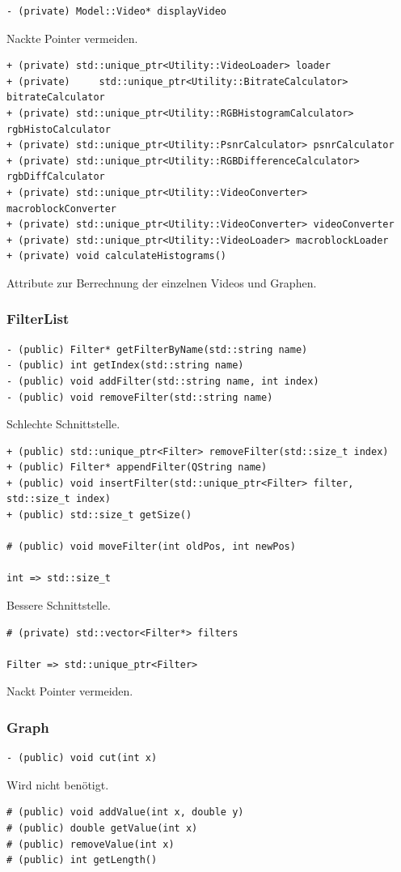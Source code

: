 \documentclass{scrartcl}
\begin{document}
{\begin{verbatim}
- (private) Model::Video* displayVideo
\end{verbatim}
Nackte Pointer vermeiden.
\bigskip
\begin{verbatim}
+ (private) std::unique_ptr<Utility::VideoLoader> loader
+ (private) 	std::unique_ptr<Utility::BitrateCalculator> bitrateCalculator
+ (private) std::unique_ptr<Utility::RGBHistogramCalculator> rgbHistoCalculator
+ (private) std::unique_ptr<Utility::PsnrCalculator> psnrCalculator
+ (private) std::unique_ptr<Utility::RGBDifferenceCalculator> rgbDiffCalculator
+ (private) std::unique_ptr<Utility::VideoConverter> macroblockConverter
+ (private) std::unique_ptr<Utility::VideoConverter> videoConverter
+ (private) std::unique_ptr<Utility::VideoLoader> macroblockLoader
+ (private) void calculateHistograms()
\end{verbatim}
Attribute zur Berrechnung der einzelnen Videos und Graphen.
\newpage
\subsubsection{FilterList}
\bigskip
\begin{verbatim}
- (public) Filter* getFilterByName(std::string name)
- (public) int getIndex(std::string name)
- (public) void addFilter(std::string name, int index)
- (public) void removeFilter(std::string name)
\end{verbatim}
Schlechte Schnittstelle.
\bigskip
\begin{verbatim}
+ (public) std::unique_ptr<Filter> removeFilter(std::size_t index)
+ (public) Filter* appendFilter(QString name)
+ (public) void insertFilter(std::unique_ptr<Filter> filter, std::size_t index)
+ (public) std::size_t getSize()

# (public) void moveFilter(int oldPos, int newPos)

int => std::size_t
\end{verbatim}
Bessere Schnittstelle.
\bigskip
\begin{verbatim}
# (private) std::vector<Filter*> filters

Filter => std::unique_ptr<Filter>
\end{verbatim}
Nackt Pointer vermeiden.
\bigskip
\subsubsection{Graph}
\bigskip
\begin{verbatim}
- (public) void cut(int x)
\end{verbatim}
Wird nicht benötigt.
\bigskip
\begin{verbatim}
# (public) void addValue(int x, double y)
# (public) double getValue(int x)
# (public) removeValue(int x)
# (public) int getLength()


\end{verbatim}}
\end{document}
